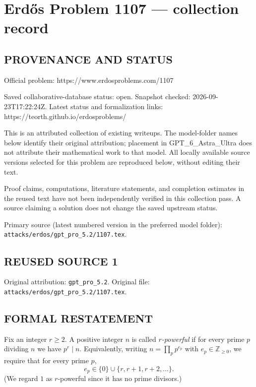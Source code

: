 \section*{Erd\H{o}s Problem 1107 --- collection record}

\subsection*{PROVENANCE AND STATUS}
Official problem: https://www.erdosproblems.com/1107

Saved collaborative-database status: open.
Snapshot checked: 2026-09-23T17:22:24Z.
Latest status and formalization links: https://teorth.github.io/erdosproblems/

This is an attributed collection of existing writeups. The model-folder names below identify their original attribution; placement in GPT\_6\_Astra\_Ultra does not attribute their mathematical work to that model. All locally available source versions selected for this problem are reproduced below, without editing their text.

Proof claims, computations, literature statements, and completion estimates in the reused text have not been independently verified in this collection pass. A source claiming a solution does not change the saved upstream status.

Primary source (latest numbered version in the preferred model folder): \texttt{attacks/erdos/gpt\_pro\_5.2/1107.tex}.

\subsection*{REUSED SOURCE 1}
Original attribution: \texttt{gpt\_pro\_5.2}.
Original file: \texttt{attacks/erdos/gpt\_pro\_5.2/1107.tex}.


\subsection*{FORMAL RESTATEMENT}
Fix an integer $r\ge 2$. A positive integer $n$ is called \emph{$r$-powerful} if for every prime $p$ dividing $n$ we have $p^r\mid n$.
Equivalently, writing $n=\prod_{p} p^{e_p}$ with $e_p\in\mathbb{Z}_{\ge 0}$, we require that for every prime $p$,
\[e_p\in\{0\}\cup\{r,r+1,r+2,\dots\}.\]
(We regard $1$ as $r$-powerful since it has no prime divisors.)

